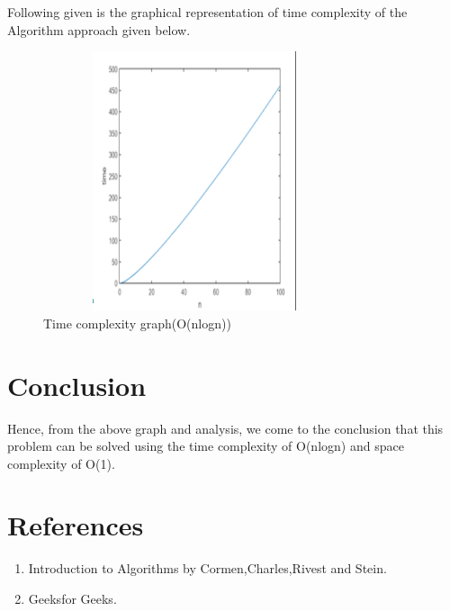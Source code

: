 \documentclass[conference]{IEEEtran}
\begin{document}
Following given is the graphical representation  of time complexity of the Algorithm  approach given below.

\begin{figure}[ht!] %
\centering
\includegraphics[width=3.5in,height=3in]{graph.png}
\caption{Time complexity graph(O(nlogn))}
\label{Courant_2}
\end{figure}\hfill \break\hfill \break



\section{\textbf{Conclusion}}
Hence, from the above graph and analysis, we come to the conclusion that this problem can be solved using the time complexity of O(nlogn) and space complexity of O(1). 


\section{\textbf{References}}
\begin{enumerate}
  \item Introduction to Algorithms by Cormen,Charles,Rivest and Stein.\\
  \item Geeksfor Geeks.\\
 
\end{enumerate}
\end{document}
